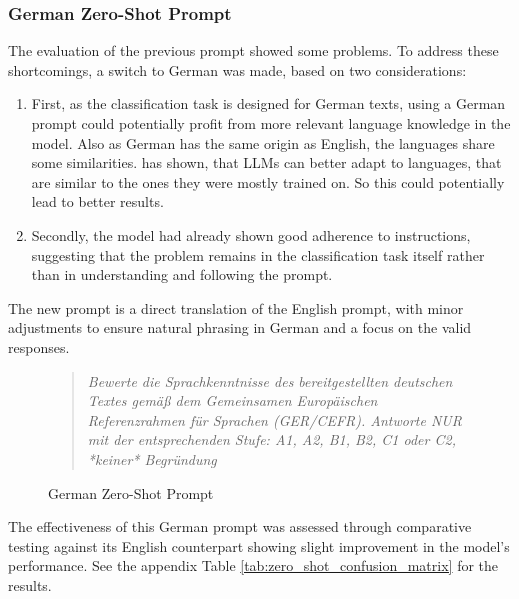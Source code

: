 \subsubsection*{German Zero-Shot Prompt}
\label{ss:german_zero_shot_prompt}
The evaluation of the previous prompt showed some problems. To address these shortcomings, a switch to German was made, based on two considerations:
\begin{enumerate}
    \item First, as the classification task is designed for German texts, using a German prompt could potentially profit from more relevant language knowledge in the model. Also as German has the same origin as English, the languages share some similarities. \cite{Pires2019} has shown, that LLMs can better adapt to languages, that are similar to the ones they were mostly trained on. So this could potentially lead to better results.
    \item Secondly, the model had already shown good adherence to instructions, suggesting that the problem remains in the classification task itself rather than in understanding and following the prompt.
\end{enumerate}
The new prompt is a direct translation of the English prompt, with minor adjustments to ensure natural phrasing in German and a focus on the valid responses.
\captionsetup{labelformat=prompt}
\begin{figure}[h]
    \begin{quotation}
        \textit{Bewerte die Sprachkenntnisse des bereitgestellten deutschen Textes gemäß dem Gemeinsamen Europäischen Referenzrahmen für Sprachen (GER/CEFR). Antworte NUR mit der entsprechenden Stufe: A1, A2, B1, B2, C1 oder C2, *keiner* Begründung}
    \end{quotation}
    \caption{German Zero-Shot Prompt}
    \label{qu:german_prompt}
\end{figure}
\captionsetup{labelformat=default}

The effectiveness of this German prompt was assessed through comparative testing against its English counterpart showing slight improvement in the model's performance. See the appendix Table \ref{tab:zero_shot_confusion_matrix} for the results.


